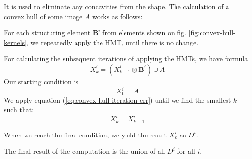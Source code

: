 \documentclass[12pt]{article}
\begin{document}
It is used to eliminate any concavities from the shape.
The calculation of a convex hull of some image $A$ works as follows:

For each structuring element $\mathbf{B}^i$ from elements shown on fig. \ref{fig:convex-hull-kernels},
we repeatedly apply the HMT, until there is no change.

For calculating the subsequent iterations of applying the HMTs, we have formula
\begin{equation}
    X^i_k = (X^i_{k-1} \otimes \mathbf{B}^i) \cup A
    \label{eq:convex-hull-iteration-err}
\end{equation}
Our starting condition is
\begin{equation}
    X^i_0 = A
    \label{eq:convex-hull-start-condition}
\end{equation}
We apply equation (\ref*{eq:convex-hull-iteration-err}) until we find the smallest $k$ such that:
\begin{equation}
    X^i_k = X^i_{k-1}
    \label{eq:convex-hull-final-condition}
\end{equation}

When we reach the final condition, we yield the result $X^i_k$ as $D^i$.

The final result of the computation is the union of all $D^i$ for all $i$.
\end{document}
